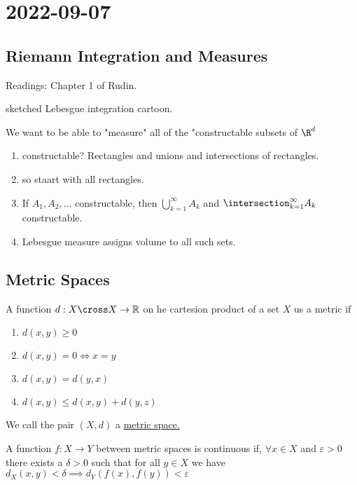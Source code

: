 \section{2022-09-07}

\subsection{Riemann Integration and Measures}

Readings: Chapter 1 of Rudin.

sketched Lebesgue integration cartoon.

We want to be able to "measure" all of the "constructable subsets of $\R^d$

\begin{enumerate}
	\item constructable? Rectangles and unions and intersections of rectangles.
	\item so staart with all rectangles.
	\item If $A_1, A_2, \ldots$ constructable, then
		$\bigcup_{k=1}^{\infty}A_k$ and $\intersection_{k=1}^{\infty}A_k$ constructable.
	\item Lebesgue measure assigns volume to all such sets.
\end{enumerate}
 
\subsection{Metric Spaces}

A function $d : X \cross X \to \mathbb{R}$ on he cartesion product of a set  $X$ us a metric if

\begin{enumerate}
	\item $d(x,y) \geq 0$
	\item $d(x,y) = 0 \iff x = y$
	\item $d(x,y) = d(y,x)$
	\item $d(x,y) \leq d(x,y) + d(y,z)$
\end{enumerate}

We call the pair $(X, d)$ a \underline{metric space.}

\begin{definition}
A function $f : X \to Y$ between metric spaces is continuous if, $\forall x \in X$ and $\varepsilon >0 $ there exists a $\delta >0$ such that for all $y \in X$ we have $d_X (x, y) < \delta \implies d_Y(f(x), f(y)) < \varepsilon$	
\end{definition}


